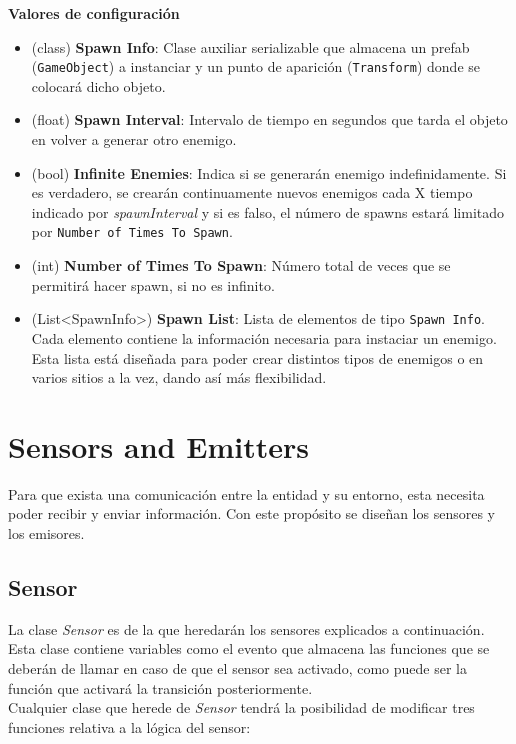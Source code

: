 \textbf{Valores de configuración}
\begin{itemize}
    \item (class) \textbf{Spawn Info}: Clase auxiliar serializable que almacena un prefab (\texttt{GameObject}) a instanciar y un punto de aparición (\texttt{Transform}) donde se colocará dicho objeto.
    \item (float) \textbf{ Spawn Interval}: Intervalo de tiempo en segundos que tarda el objeto en volver a generar otro enemigo. 
    \item (bool) \textbf{Infinite Enemies}: Indica si se generarán enemigo indefinidamente. Si es verdadero, se crearán continuamente nuevos enemigos cada X tiempo indicado por  \textit{spawnInterval}  y si es falso, el número de spawns estará limitado por \texttt{Number of Times To Spawn}.
    \item (int) \textbf{Number of Times To Spawn}: Número total de veces que se permitirá hacer spawn, si no es infinito.
    \item (List<SpawnInfo>) \textbf{Spawn List}: Lista de elementos de tipo \texttt{Spawn Info}. Cada elemento contiene la información necesaria para instaciar un enemigo. Esta lista está diseñada para poder crear distintos tipos de enemigos o en varios sitios a la vez, dando así más flexibilidad.
\end{itemize}


\section{Sensors and Emitters}

Para que exista una comunicación entre la entidad y su entorno, esta necesita poder recibir y enviar información. Con este propósito se diseñan los sensores y los emisores.\\

\subsection{Sensor}

La clase \textit{Sensor} es de la que heredarán los sensores explicados a continuación. Esta clase contiene variables como el evento que almacena las funciones que se deberán de llamar en caso de que el sensor sea activado, como puede ser la función que activará la transición posteriormente.\\

Cualquier clase que herede de \textit{Sensor} tendrá la posibilidad de modificar tres funciones relativa a la lógica del sensor:

